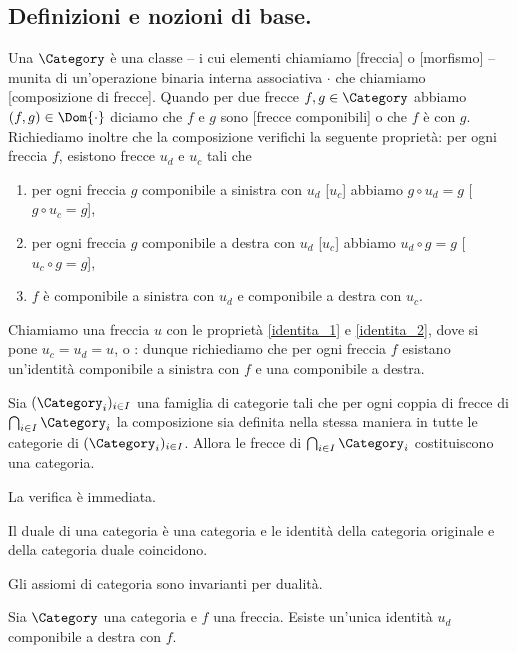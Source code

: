 \subsection{Definizioni e nozioni di base.}\label{CategorieDefinizioniENozioniDiBase}
\begin{Definition}
	Una  $\Category$ \`e una classe -- i cui elementi chiamiamo [freccia] o [morfismo] -- munita di un'operazione binaria interna associativa $\cdot$ che chiamiamo [composizione di frecce]. Quando per due frecce $f,g \in \Category$ abbiamo $(f,g) \in \Dom{\cdot}$ diciamo che $f$ e $g$ sono [frecce componibili] o che $f$ \`e  con $g$. Richiediamo inoltre che la composizione verifichi la seguente propriet\`a: per ogni freccia $f$, esistono frecce $u_d$ e $u_c$ tali che
		\begin{enumerate}
			\item per ogni freccia $g$ componibile a sinistra con $u_d$ [$u_c$] abbiamo $g \circ u_d = g$ [$g \circ u_c = g$],\label{identita_1}
			\item per ogni freccia $g$ componibile a destra con $u_d$ [$u_c$] abbiamo $u_d \circ g = g$ [$u_c \circ g = g$],\label{identita_2}
			\item $f$ \`e componibile a sinistra con $u_d$ e componibile a destra con $u_c$.
		\end{enumerate}
	Chiamiamo una freccia $u$ con le propriet\`a \ref{identita_1} e \ref{identita_2}, dove si pone $u_c = u_d = u$,  o : dunque richiediamo che per ogni freccia $f$ esistano un'identit\`a componibile a sinistra con $f$ e una componibile a destra.
\end{Definition}
\begin{Theorem}
	Sia $(\Category_i)_{i \in I}$ una famiglia di categorie tali che per ogni coppia di frecce di $\bigcap_{i \in I} \Category_i$ la composizione sia definita nella stessa maniera in tutte le categorie di $(\Category_i)_{i \in I}$. Allora le frecce di $\bigcap_{i \in I} \Category_i$ costituiscono una categoria.
\end{Theorem}
\Proof La verifica \`e immediata. \EndProof
\begin{Theorem}
	Il duale di una categoria \`e una categoria e le identit\`a della categoria originale e della categoria duale coincidono.
\end{Theorem}
\Proof Gli assiomi di categoria sono invarianti per dualit\`a. \EndProof
\begin{Theorem}\label{unicita_dominio}
	Sia $\Category$ una categoria e $f$ una freccia. Esiste un'unica identit\`a $u_d$ componibile a destra con $f$.
\end{Theorem}
